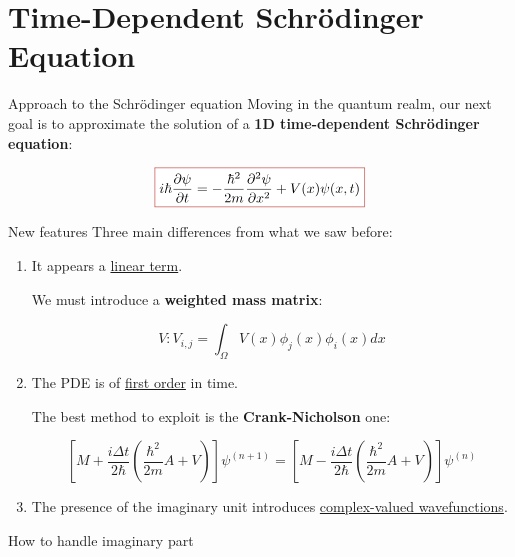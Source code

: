 \section{Time-Dependent Schrödinger Equation}

\begin{frame}{Approach to the Schrödinger equation}
    Moving in the quantum realm, our next goal is to approximate the solution of a \textbf{1D time-dependent \textcolor{BrickRed}{Schrödinger equation}}:

    \begin{equation*}
        \fcolorbox{BrickRed}{white}{\text{$\displaystyle i\hbar\frac{\partial\psi}{\partial t}=-\frac{\hbar^2}{2m}\frac{\partial^2\psi}{\partial x^2}+V(x)\psi(x,t)$}}
    \end{equation*}
\end{frame}

\begin{frame}{New features}
    Three main differences from what we saw before:

    \vfill

    \begin{enumerate}
        \item It appears a \underline{linear term}.
        
        We must introduce a \textbf{weighted mass matrix}:
        
        \begin{equation*}
            V:V_{i,j}=\int_\Omega V(x)\phi_j(x)\phi_i(x)dx
        \end{equation*}

        \vspace{0.25cm}
        
        \item The PDE is of \underline{first order} in time.
        
        The best method to exploit is the \textbf{Crank-Nicholson} one:
        
        \begin{equation*}
            \left[M+\frac{i\Delta t}{2\hbar}\left(\frac{\hbar^2}{2m}A+V\right)\right]\psi^{(n+1)}=\left[M-\frac{i\Delta t}{2\hbar}\left(\frac{\hbar^2}{2m}A+V\right)\right]\psi^{(n)}
        \end{equation*}

        \vspace{0.25cm}

        \item The presence of the imaginary unit introduces \underline{complex-valued wavefunctions}.
    \end{enumerate}
\end{frame}

\begin{frame}{How to handle imaginary part}
    
\end{frame}
